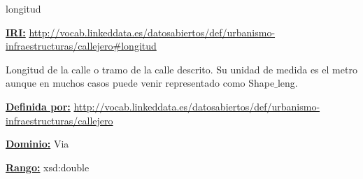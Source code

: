 \begin{mybox}{longitud}
\begin{flushleft}
\underline{\textbf{IRI:}}
\url{http://vocab.linkeddata.es/datosabiertos/def/urbanismo-infraestructuras/callejero#longitud}
\newline

Longitud de la calle o tramo de la calle descrito. Su unidad de medida es el metro aunque en muchos casos puede venir representado como Shape$\_$leng.
\newline

\underline{\textbf{Definida por:}}\newline
\url{http://vocab.linkeddata.es/datosabiertos/def/urbanismo-infraestructuras/callejero}
\newline

\underline{\textbf{Dominio:}}
		Via
\newline

\underline{\textbf{Rango:}}
		xsd:double

\end{flushleft}
\end{mybox}







